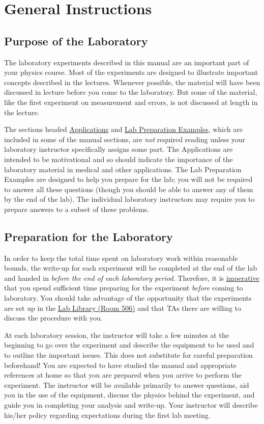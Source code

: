 \chapter{General Instructions}

\section{Purpose of the Laboratory}

The laboratory experiments described in this manual are an important part of your physics course.  Most of the experiments are designed to illustrate important concepts described in the lectures.  Whenever possible, the material will have been discussed in lecture before you come to the laboratory.  But some of the material, like the first experiment on measurement and errors, is not discussed at length in the lecture.\myskip

The sections headed \underline{Applications} and \underline{Lab Preparation Examples}, which are included in some of the manual sections, are \emph{not} required reading unless your laboratory instructor specifically assigns some part.  The Applications are intended to be motivational and so should indicate the importance of the laboratory material in medical and other applications.  The Lab Preparation Examples are designed to help you prepare for the lab; you will not be required to answer all these questions (though you should be able to answer any of them by the end of the lab).  The individual laboratory instructors may require you to prepare answers to a subset of these problems.\myskip

\section{Preparation for the Laboratory}

In order to keep the total time spent on laboratory work within reasonable bounds, the write-up for each experiment will be completed at the end of the lab and handed in \emph{before the end of each laboratory period}.  Therefore, it is \underline{imperative} that you spend sufficient time preparing for the experiment \emph{before} coming to laboratory. You should take advantage of the opportunity that the experiments are set up in the \underline{Lab Library (Room 506)} and that TAs there are willing to discuss the procedure with you.\myskip

At each laboratory session, the instructor will take a few minutes at the beginning to go over the experiment and describe the equipment to be used and to outline the important issues. This does not substitute for careful preparation beforehand!  You are expected to have studied the manual and appropriate references at home so that you are prepared when you arrive to perform the experiment.  The instructor will be available primarily to answer questions, aid you in the use of the equipment, discuss the physics behind the experiment, and guide you in completing your analysis and write-up.  Your instructor will describe his/her policy regarding expectations during the first lab meeting.\myskip

